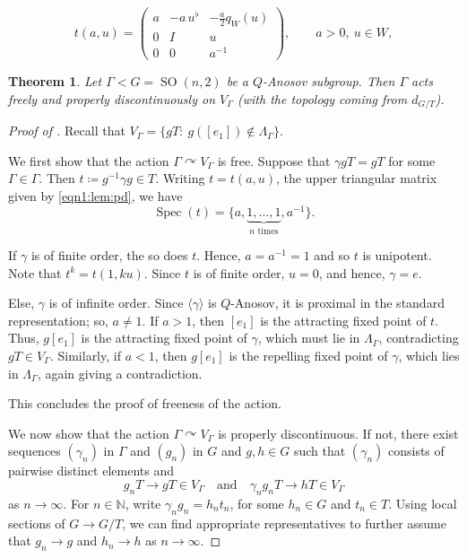 \documentclass[10pt,a4paper]{amsart}
\newtheorem{theorem}{Theorem}
\newcommand{\SO}{\operatorname{SO}}
\newcommand{\acts}{\curvearrowright}
\begin{document}
    \begin{equation}\label{eqn1:lem:pd}
    t(a,u)=
    \begin{pmatrix}
    a&-a\,u^\flat&-\frac a2q_W(u)\\
    0&I&u\\
    0&0&a^{-1}
    \end{pmatrix},
    \qquad a>0,\ u\in W,
    \end{equation}

\begin{theorem}\label{thm:proper-on-V}
Let $\Gamma<G=\SO(n,2)$ be a  $Q$-Anosov subgroup. Then $\Gamma$ acts freely and properly discontinuously on $V_\Gamma$ (with the topology coming from $d_{G/T}$).
\end{theorem}

\begin{proof}[Proof of ]
    Recall that $V_\Gamma = \{ g T :\ g([e_1]) \not\in\Lambda_\Gamma \}$.

    We first show that the action $\Gamma \acts V_\Gamma$ is free. Suppose that $\gamma g T = g T$ for some $\Gamma \in\Gamma$. Then $t \coloneqq g^{-1} \gamma g \in T$. Writing $t = t(a,u)$, the upper triangular matrix given by \eqref{eqn1:lem:pd}, we have
    \[
     \operatorname{Spec} (t) = \{ a,\underbrace{1,\dots,1}_{n \text{ times}}, a^{-1} \}.
    \]

    If $\gamma$ is of finite order, the so does $t$. Hence, $a = a^{-1} = 1$ and so $t$ is unipotent. Note that $t^k = t(1, ku)$. Since $t$ is of finite order, $u=0$, and hence, $\gamma = e$.

    Else, $\gamma$ is of infinite order. Since $\langle \gamma\rangle$ is $Q$-Anosov, it is proximal in the standard representation; so, $a \ne 1$. If $a>1$, then $[e_1]$ is the attracting fixed point of $t$. Thus, $g[e_1]$ is the attracting fixed point of $\gamma$, which must lie in $\Lambda_\Gamma$, contradicting $gT \in V_\Gamma$. Similarly, if $a<1$, then $g[e_1]$ is the repelling fixed point of $\gamma$, which lies in $\Lambda_\Gamma$, again giving a contradiction.

    This concludes the proof of freeness of the action.

    We now show that the action $\Gamma \acts V_\Gamma$ is properly discontinuous.
    If not, there exist sequences $(\gamma_n)$ in $\Gamma$ and $(g_n)$ in $G$ and $g,h\in G$ such that $(\gamma_n)$ consists of pairwise distinct elements and
    \begin{equation}\label{eqn2:lem:pd}
     g_n T \to g T \in V_\Gamma
     \quad\text{and}\quad
     \gamma_n g_n T \to h T \in V_\Gamma
    \end{equation}
    as $n\to\infty$. For $n\in\mathbb N$, write $\gamma_n g_n = h_n t_n$, for some $h_n \in G$ and $t_n \in T$.
    Using local sections of $G \to G/T$, we can find appropriate representatives to further assume that $g_n \to g$ and $h_n \to h$ as $n\to\infty$.


\end{proof}
\end{document}

